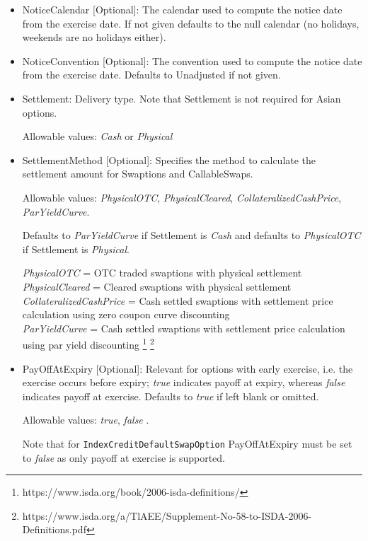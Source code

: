 \begin{itemize}
\item NoticeCalendar [Optional]: The calendar used to compute the notice date from the exercise date. If not given
  defaults to the null calendar (no holidays, weekends are no holidays either).

\item NoticeConvention [Optional]: The convention used to compute the notice date from the exercise date. Defaults to
  Unadjusted if not given.

\item Settlement: Delivery type. Note that Settlement is not required for Asian options.

  Allowable values: \emph{Cash} or \emph{Physical}

\item SettlementMethod [Optional]: Specifies the method to calculate the settlement amount for Swaptions and CallableSwaps.

  Allowable values: \emph{PhysicalOTC}, \emph{PhysicalCleared}, \emph{CollateralizedCashPrice},\\ \emph{ParYieldCurve}. 
  
  Defaults to \emph{ParYieldCurve} if Settlement is \emph{Cash} and defaults to \emph{PhysicalOTC} if Settlement is \emph{Physical}.

\emph{PhysicalOTC} = OTC traded swaptions with physical settlement\\
\emph{PhysicalCleared} = Cleared swaptions with physical settlement\\
\emph{CollateralizedCashPrice} = Cash settled swaptions with settlement price calculation using zero coupon curve discounting \\
\emph{ParYieldCurve}  = Cash settled swaptions with settlement price calculation using par yield discounting \footnote{https://www.isda.org/book/2006-isda-definitions/} \footnote{https://www.isda.org/a/TlAEE/Supplement-No-58-to-ISDA-2006-Definitions.pdf} \\

\item PayOffAtExpiry [Optional]: Relevant for options with early
  exercise, i.e. the exercise occurs before expiry; \emph{true}
  indicates payoff at expiry, whereas \emph{false}  indicates payoff
  at exercise. Defaults to \emph{true}  if left blank or omitted. 

Allowable values: \emph{true}, \emph{false} .

Note that for \lstinline!IndexCreditDefaultSwapOption! PayOffAtExpiry must be set to \emph{false} as only payoff at exercise is supported.


\end{itemize}
